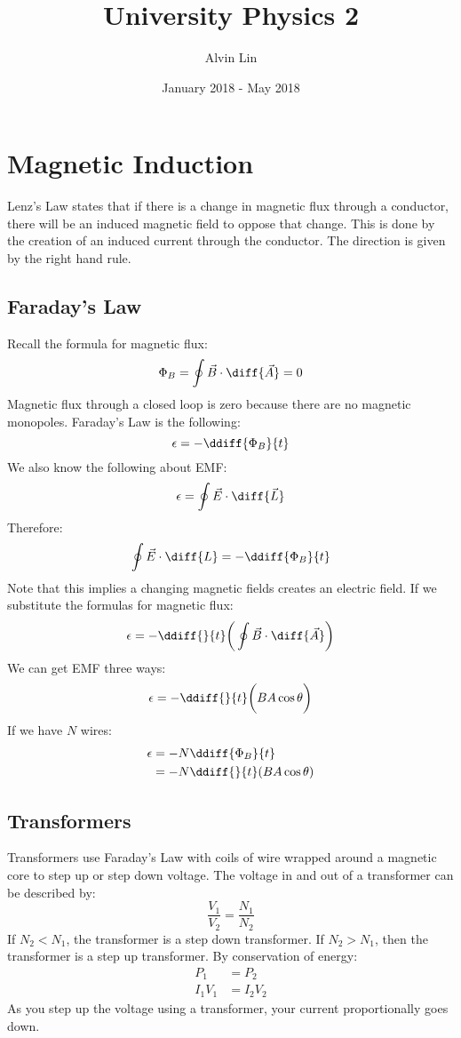 \documentclass{math}
\title{University Physics 2}
\author{Alvin Lin}
\date{January 2018 - May 2018}
\begin{document}
\maketitle

\section*{Magnetic Induction}
Lenz's Law states that if there is a change in magnetic flux through a
conductor, there will be an induced magnetic field to oppose that change. This
is done by the creation of an induced current through the conductor. The
direction is given by the right hand rule.

\subsection*{Faraday's Law}
Recall the formula for magnetic flux:
\[ \Phi_B = \oint\vec{B}\cdot\diff{\vec{A}} = 0 \]
Magnetic flux through a closed loop is zero because there are no magnetic
monopoles. Faraday's Law is the following:
\[ \epsilon = -\ddiff{\Phi_B}{t} \]
We also know the following about EMF:
\[ \epsilon = \oint\vec{E}\cdot\diff{\vec{L}} \]
Therefore:
\[ \oint\vec{E}\cdot\diff{L} = -\ddiff{\Phi_B}{t} \]
Note that this implies a changing magnetic fields creates an electric field.
If we substitute the formulas for magnetic flux:
\[ \epsilon = -\ddiff{}{t}\bigg(\oint\vec{B}\cdot\diff{\vec{A}}\bigg) \]
We can get EMF three ways:
\[ \epsilon = -\ddiff{}{t}\bigg(BA\cos\theta\bigg) \]
If we have \( N \) wires:
\begin{align*}
  \epsilon &= -N\ddiff{\Phi_B}{t} \\
  &= -N\ddiff{}{t}(BA\cos\theta)
\end{align*}

\subsection*{Transformers}
Transformers use Faraday's Law with coils of wire wrapped around a magnetic
core to step up or step down voltage. The voltage in and out of a transformer
can be described by:
\[ \frac{V_1}{V_2} = \frac{N_1}{N_2} \]
If \( N_2 < N_1 \), the transformer is a step down transformer. If
\( N_2 > N_1 \), then the transformer is a step up transformer. By conservation
of energy:
\begin{align*}
  P_1 &= P_2 \\
  I_1V_1 &= I_2V_2
\end{align*}
As you step up the voltage using a transformer, your current proportionally
goes down.
\end{document}
